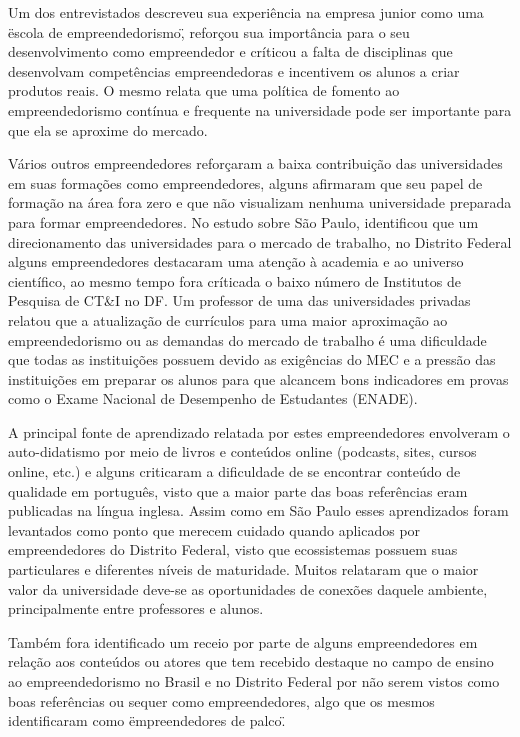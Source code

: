 Um dos entrevistados descreveu sua experiência na empresa junior como uma \"escola de empreendedorismo\", reforçou sua importância para o seu desenvolvimento como empreendedor e críticou a falta de disciplinas que desenvolvam competências empreendedoras e incentivem os alunos a criar produtos reais. O mesmo relata que uma política de fomento ao empreendedorismo contínua e frequente na universidade pode ser importante para que ela se aproxime do mercado. 

Vários outros empreendedores reforçaram a baixa contribuição das universidades em suas formações como empreendedores, alguns afirmaram que seu papel de formação na área fora zero e que não visualizam nenhuma universidade preparada para formar empreendedores. No estudo sobre São Paulo,  identificou que um direcionamento das universidades para o mercado de trabalho, no Distrito Federal alguns empreendedores destacaram uma atenção à academia e ao universo científico, ao mesmo tempo fora críticada o baixo número de Institutos de Pesquisa de CT\&I no DF. Um professor de uma das universidades privadas relatou que a atualização de currículos para uma maior aproximação ao empreendedorismo ou as demandas do mercado de trabalho é uma dificuldade que todas as instituições possuem devido as exigências do MEC e a pressão das instituições em preparar os alunos para que alcancem bons indicadores em provas como o Exame Nacional de Desempenho de Estudantes (ENADE). 

A principal fonte de aprendizado relatada por estes empreendedores envolveram o auto-didatismo por meio de livros e conteúdos online (podcasts, sites, cursos online, etc.) e alguns criticaram a dificuldade de se encontrar conteúdo de qualidade em português, visto que a maior parte das boas referências eram publicadas na língua inglesa. Assim como em São Paulo esses aprendizados foram levantados como ponto que merecem cuidado quando aplicados por empreendedores do Distrito Federal, visto que ecossistemas possuem suas particulares e diferentes níveis de maturidade. Muitos relataram que o maior valor da universidade deve-se as oportunidades de conexões daquele ambiente, principalmente entre professores e alunos.

Também fora identificado um receio por parte de alguns empreendedores em relação aos conteúdos ou atores que tem recebido destaque no campo de ensino ao empreendedorismo no Brasil e no Distrito Federal por não serem vistos como boas referências ou sequer como empreendedores, algo que os mesmos identificaram como \"empreendedores de palco\".

